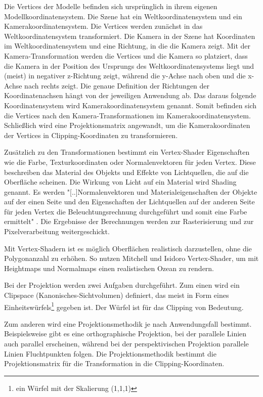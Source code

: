 Die Vertices der Modelle befinden sich ursprünglich in ihrem eigenen Modellkoordinatensystem. Die Szene hat ein Weltkoordinatensystem und ein Kamerakoordinatensystem. Die Vertices werden zunächst in das Weltkoordinatensystem transformiert. Die Kamera in der Szene hat Koordinaten im Weltkoordinatensystem und eine Richtung, in die die Kamera zeigt. Mit der Kamera-Transformation werden die Vertices und die Kamera so platziert, dass die Kamera in der Position des Ursprungs des Weltkoordinatensystems liegt und (meist) in negativer z-Richtung zeigt, während die y-Achse nach oben und die x-Achse nach rechts zeigt. Die genaue Definition der Richtungen der Koordinatenachsen hängt von der jeweiligen Anwendung ab. Das daraus folgende Koordinatensystem wird Kamerakoordinatensystem genannt. Somit befinden sich die Vertices nach den Kamera-Transformationen im Kamerakoordinatensystem. Schließlich wird eine Projektionsmatrix angewandt, um die Kamerakoordinaten der Vertices in Clipping-Koordinaten zu transformieren.

Zusätzlich zu den Transformationen bestimmt ein Vertex-Shader Eigenschaften wie die Farbe, Texturkoordinaten oder Normalenvektoren für jeden Vertex. Diese beschreiben das Material des Objekts und Effekte von Lichtquellen, die auf die Oberfläche scheinen. Die Wirkung von Licht auf ein Material wird Shading genannt. Es werden "[..]Normalenvektoren und Materialeigenschaften der Objekte auf der einen Seite und den Eigenschaften der Lichtquellen auf der anderen Seite für jeden Vertex die Beleuchtungsrechnung durchgeführt und somit eine Farbe ermittelt" \cite*[Nischwitz (2012) S.48,][]{nischwitz2012}. Die Ergebnisse der Berechnungen werden zur Rasterisierung und zur Pixelverarbeitung weitergeschickt\cite*[Moeller (2019)]{moeller2019}.

Mit Vertex-Shadern ist es möglich Oberflächen realistisch darzustellen, ohne die Polygonanzahl zu erhöhen. So nutzen Mitchell\cite*[][]{mitchell2005} und Isidoro \cite*[][]{isidoro2002} Vertex-Shader, um mit Heightmaps %
und Normalmaps %
einen realistischen Ozean zu rendern.

\label{grp-geometrieverarbeitung-projektion}
Bei der Projektion werden zwei Aufgaben durchgeführt. Zum einen wird ein Clipspace (Kanonisches-Sichtvolumen) definiert, das meist in Form eines Einheitswürfels\footnote{ein Würfel mit der Skalierung (1,1,1)} gegeben ist. Der Würfel ist für das Clipping von Bedeutung.

Zum anderen wird eine Projektionsmethodik je nach Anwendungsfall bestimmt. Beispielsweise gibt es eine orthographische Projektion, bei der parallele Linien auch parallel erscheinen, während bei der perspektivischen Projektion parallele Linien Fluchtpunkten folgen. Die Projektionsmethodik bestimmt die Projektionsmatrix für die Transformation in die Clipping-Koordinaten.

